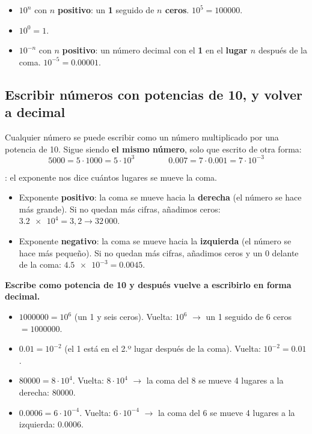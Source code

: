 \begin{impt}
    \begin{itemize}
        \item \(10^{n}\) con \(n\) \textbf{positivo}: un \textbf{1} seguido de \textbf{\(n\) ceros}. \quad \(10^{5} = \num{100000}\).
        \item \(10^{0} = 1\).
        \item \(10^{-n}\) con \(n\) \textbf{positivo}: un número decimal con el \textbf{1} en el \textbf{lugar \(n\)} después de la coma. \quad \(10^{-5} = \num{0.00001}\).
    \end{itemize}
\end{impt}

\subsection{Escribir números con potencias de 10, y volver a decimal}

Cualquier número se puede escribir como un número multiplicado por una potencia de 10. Sigue siendo \textbf{el mismo número}, solo que escrito de otra forma:
\begin{equation*}
    \num{5000} = 5 \cdot \num{1000} = 5 \cdot 10^{3}
    \qquad\qquad
    \num{0.007} = 7 \cdot \num{0.001} = 7 \cdot 10^{-3}
\end{equation*}

: el exponente nos dice cuántos lugares se mueve la coma.
\begin{itemize}
    \item Exponente \textbf{positivo}: la coma se mueve hacia la \textbf{derecha} (el número se hace más grande). Si no quedan más cifras, añadimos ceros: \(\num{3.2e4} = 3{,}2 \to 32\,000\).
    \item Exponente \textbf{negativo}: la coma se mueve hacia la \textbf{izquierda} (el número se hace más pequeño). Si no quedan más cifras, añadimos ceros y un 0 delante de la coma: \(\num{4.5e-3} = \num{0.0045}\).
\end{itemize}

\begin{example}
    \textbf{Escribe como potencia de 10 y después vuelve a escribirlo en forma decimal.}
    \begin{itemize}
        \item \(\num{1000000} = 10^{6}\) (un 1 y seis ceros). Vuelta: \(10^{6}\) \(\to\) un 1 seguido de 6 ceros \(= \num{1000000}\).
        \item \(\num{0.01} = 10^{-2}\) (el 1 está en el 2.º lugar después de la coma). Vuelta: \(10^{-2} = \num{0.01}\).
        \item \(\num{80000} = 8 \cdot 10^{4}\). Vuelta: \(8 \cdot 10^{4}\) \(\to\) la coma del 8 se mueve 4 lugares a la derecha: \(\num{80000}\).
        \item \(\num{0.0006} = 6 \cdot 10^{-4}\). Vuelta: \(6 \cdot 10^{-4}\) \(\to\) la coma del 6 se mueve 4 lugares a la izquierda: \(\num{0.0006}\).
    \end{itemize}
\end{example}

